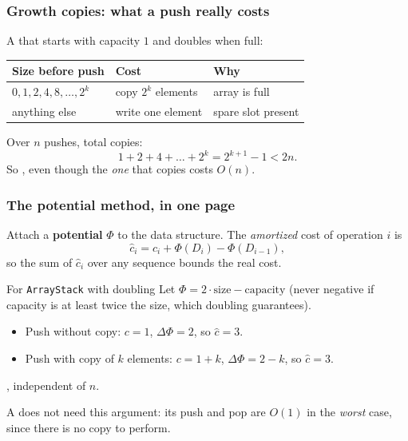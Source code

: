 \documentclass[aspectratio=169,10pt,compress]{beamer}
\begin{document}
\begin{frame}[t,fragile] \frametitle{Growth copies: what a push really costs}
  A  that starts with capacity $1$ and doubles when full:
  \begin{center}\small
  \begin{tabular}{@{}lll@{}}
    \toprule
    \textbf{Size before push} & \textbf{Cost} & \textbf{Why} \\
    \midrule
    $0, 1, 2, 4, 8, \dots, 2^k$ & copy $2^k$ elements & array is full \\
    anything else               & write one element   & spare slot present \\
    \bottomrule
  \end{tabular}
  \end{center}
  \vspace{0.3em}
  \small
  Over $n$ pushes, total copies:
  \[
    1 + 2 + 4 + \dots + 2^{k} = 2^{k+1} - 1 < 2n .
  \]
  So , even though the
  \emph{one} that copies costs $O(n)$.
\end{frame}




\begin{frame}[t,fragile] \frametitle{The potential method, in one page}
  Attach a \textbf{potential} $\Phi$ to the data structure. The
  \emph{amortized} cost of operation $i$ is
  \[
    \hat{c}_i = c_i + \Phi(D_i) - \Phi(D_{i-1}),
  \]
  so the sum of $\hat{c}_i$ over any sequence bounds the real cost.
  \vspace{0.4em}
  \begin{block}{For \texttt{ArrayStack} with doubling}
    \small
    Let $\Phi = 2 \cdot \text{size} - \text{capacity}$ (never negative if
    capacity is at least twice the size, which doubling guarantees).
    \begin{itemize}
      \item Push without copy: $c=1$, $\Delta\Phi=2$, so $\hat{c}=3$.
      \item Push with copy of $k$ elements: $c = 1+k$, $\Delta\Phi = 2 - k$,
            so $\hat{c} = 3$.
    \end{itemize}
    , independent of $n$.
  \end{block}
  \vspace{0.2em}
  \small
  A  does not need this argument: its push and pop are
  $O(1)$ in the \emph{worst} case, since there is no copy to perform.
\end{frame}
\end{document}

